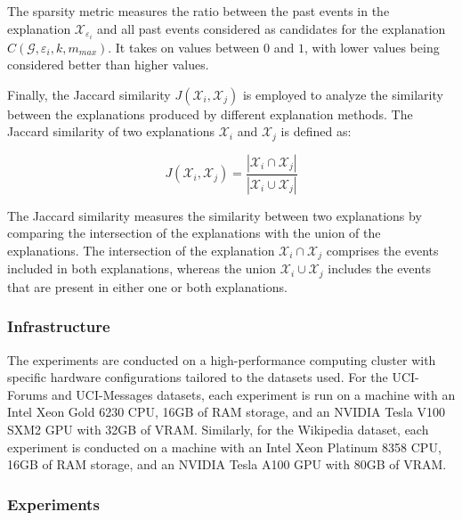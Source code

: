 The sparsity metric measures the ratio between the past events in the explanation $\mathcal{X}_{\varepsilon_i}$ and all past events considered as candidates for the explanation $C(\mathcal{G}, \varepsilon_i, k, m_{max})$. It takes on values between $0$ and $1$, with lower values being considered better than higher values.

Finally, the Jaccard similarity \cite{jaccard_distribution_1912} $J(\mathcal{X}_i, \mathcal{X}_j)$ is employed to analyze the similarity between the explanations produced by different explanation methods. The Jaccard similarity of two explanations $\mathcal{X}_i$ and $\mathcal{X}_j$ is defined as:

\begin{equation}
    J(\mathcal{X}_i, \mathcal{X}_j) = \frac{|\mathcal{X}_i \cap \mathcal{X}_j|}{|\mathcal{X}_i \cup \mathcal{X}_j|}
\end{equation}

The Jaccard similarity measures the similarity between two explanations by comparing the intersection of the explanations with the union of the explanations. The intersection of the explanation $\mathcal{X}_i \cap \mathcal{X}_j$ comprises the events included in both explanations, whereas the union $\mathcal{X}_i \cup \mathcal{X}_j$ includes the events that are present in either one or both explanations.




% 

\subsubsection{Infrastructure}
\label{s_Evaluation_Setup_Infrastructure}
The experiments are conducted on a high-performance computing cluster with specific hardware configurations tailored to the datasets used. For the UCI-Forums and UCI-Messages datasets, each experiment is run on a machine with an Intel Xeon Gold 6230 CPU, 16GB of RAM storage, and an NVIDIA Tesla V100 SXM2 GPU with 32GB of VRAM. Similarly, for the Wikipedia dataset, each experiment is conducted on a machine with an Intel Xeon Platinum 8358 CPU, 16GB of RAM storage, and an NVIDIA Tesla A100 GPU with 80GB of VRAM.

\subsubsection{Experiments}
\label{s_Evaluation_Setup_Experiments}

